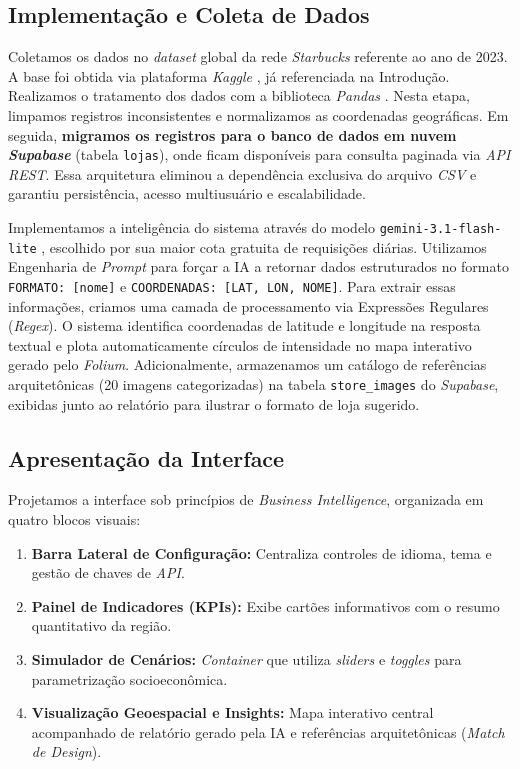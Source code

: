 \subsection{\esp Implementação e Coleta de Dados}

Coletamos os dados no \textit{dataset} global da rede \textit{Starbucks} referente ao ano de 2023. A base foi obtida via plataforma \textit{Kaggle} \cite{omarsobhy2023}, já referenciada na Introdução. Realizamos o tratamento dos dados com a biblioteca \textit{Pandas} \cite{pandas2024}. Nesta etapa, limpamos registros inconsistentes e normalizamos as coordenadas geográficas. Em seguida, \textbf{migramos os registros para o banco de dados em nuvem \textit{Supabase}} (tabela \texttt{lojas}), onde ficam disponíveis para consulta paginada via \textit{API REST}. Essa arquitetura eliminou a dependência exclusiva do arquivo \textit{CSV} e garantiu persistência, acesso multiusuário e escalabilidade.

Implementamos a inteligência do sistema através do modelo \texttt{gemini-3.1-flash-lite} \cite{gemini2024}, escolhido por sua maior cota gratuita de requisições diárias. Utilizamos Engenharia de \textit{Prompt} para forçar a IA a retornar dados estruturados no formato \texttt{FORMATO: [nome]} e \texttt{COORDENADAS: [LAT, LON, NOME]}. Para extrair essas informações, criamos uma camada de processamento via Expressões Regulares (\textit{Regex}). O sistema identifica coordenadas de latitude e longitude na resposta textual e plota automaticamente círculos de intensidade no mapa interativo gerado pelo \textit{Folium}. Adicionalmente, armazenamos um catálogo de referências arquitetônicas (20 imagens categorizadas) na tabela \texttt{store\_images} do \textit{Supabase}, exibidas junto ao relatório para ilustrar o formato de loja sugerido.

\subsection{\esp Apresentação da Interface}

Projetamos a interface sob princípios de \textit{Business Intelligence}, organizada em quatro blocos visuais:

\begin{enumerate}
    \item \textbf{Barra Lateral de Configuração:} Centraliza controles de idioma, tema e gestão de chaves de \textit{API}.
    \item \textbf{Painel de Indicadores (KPIs):} Exibe cartões informativos com o resumo quantitativo da região.
    \item \textbf{Simulador de Cenários:} \textit{Container} que utiliza \textit{sliders} e \textit{toggles} para parametrização socioeconômica.
    \item \textbf{Visualização Geoespacial e Insights:} Mapa interativo central acompanhado de relatório gerado pela IA e referências arquitetônicas (\textit{Match de Design}).
\end{enumerate}

